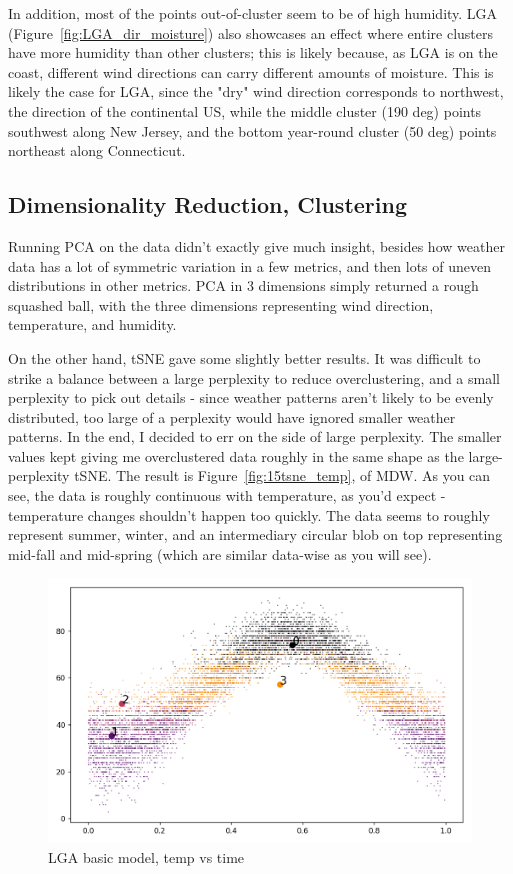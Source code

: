 \documentclass[a4paper]{article}
\begin{document}
In addition, most of the points out-of-cluster seem to be of high humidity. LGA (Figure~\ref{fig:LGA_dir_moisture}) also showcases an effect where entire clusters have more humidity than other clusters; this is likely because, as LGA is on the coast, different wind directions can carry different amounts of moisture. This is likely the case for LGA, since the "dry" wind direction corresponds to northwest, the direction of the continental US, while the middle cluster (190 deg) points southwest along New Jersey, and the bottom year-round cluster (50 deg) points northeast along Connecticut. 


\subsection{Dimensionality Reduction, Clustering}

Running PCA on the data didn't exactly give much insight, besides how weather data has a lot of symmetric variation in a few metrics, and then lots of uneven distributions in other metrics. PCA in 3 dimensions simply returned a rough squashed ball, with the three dimensions representing wind direction, temperature, and humidity. 

On the other hand, tSNE gave some slightly better results. It was difficult to strike a balance between a large perplexity to reduce overclustering, and a small perplexity to pick out details - since weather patterns aren't likely to be evenly distributed, too large of a perplexity would have ignored smaller weather patterns. In the end, I decided to err on the side of large perplexity. The smaller values kept giving me overclustered data roughly in the same shape as the large-perplexity tSNE. The result is Figure~\ref{fig:15tsne_temp}, of MDW. As you can see, the data is roughly continuous with temperature, as you'd expect - temperature changes shouldn't happen too quickly. The data seems to roughly represent summer, winter, and an intermediary circular blob on top representing mid-fall and mid-spring (which are similar data-wise as you will see). 


\begin{figure}[t]
  \centering
  \includegraphics[width=\linewidth]{../png/models/LGA-basic-temperature4.png}
  \caption{LGA basic model, temp vs time}
  \label{fig:LGA_basics}
\end{figure}
\end{document}
